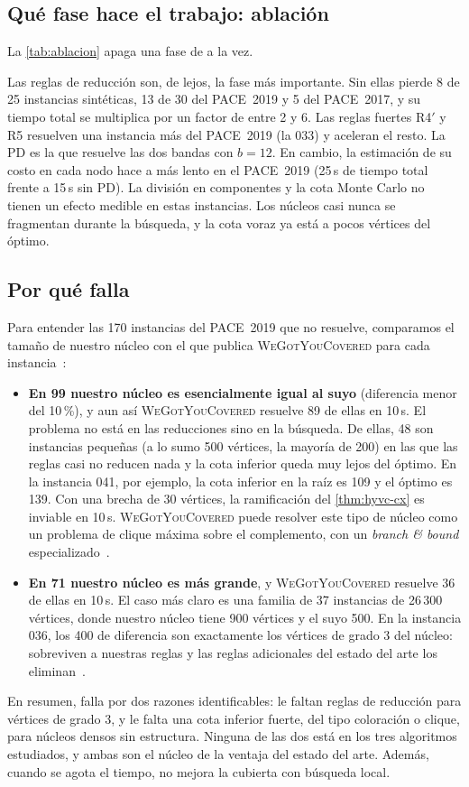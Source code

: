 \subsection{Qué fase hace el trabajo: ablación}
La \cref{tab:ablacion} apaga una fase de \hyvc{} a la vez.



Las reglas de reducción son, de lejos, la fase más importante. Sin ellas \hyvc{} pierde 8 de 25 instancias sintéticas, 13 de 30 del PACE~2019 y 5 del PACE~2017, y su tiempo total se multiplica por un factor de entre 2 y 6. Las reglas fuertes R4$'$ y R5 resuelven una instancia más del PACE~2019 (la 033) y aceleran el resto. La PD es la que resuelve las dos bandas con $b=12$. En cambio, la estimación de su costo en cada nodo hace a \hyvc{} más lento en el PACE~2019 (25\,s de tiempo total frente a 15\,s sin PD). La división en componentes y la cota Monte Carlo no tienen un efecto medible en estas instancias. Los núcleos casi nunca se fragmentan durante la búsqueda, y la cota voraz ya está a pocos vértices del óptimo.

\subsection{Por qué falla \hyvc}\label{sec:fallos}
Para entender las 170 instancias del PACE~2019 que \hyvc{} no resuelve, comparamos el tamaño de nuestro núcleo con el que publica \textsc{WeGotYouCovered} para cada instancia~\citep{hespe2020}:
\begin{itemize}
  \item \textbf{En 99 nuestro núcleo es esencialmente igual al suyo} (diferencia menor del 10\,\%), y aun así \textsc{WeGotYouCovered} resuelve 89 de ellas en 10\,s. El problema no está en las reducciones sino en la búsqueda. De ellas, 48 son instancias pequeñas (a lo sumo 500 vértices, la mayoría de 200) en las que las reglas casi no reducen nada y la cota inferior queda muy lejos del óptimo. En la instancia 041, por ejemplo, la cota inferior en la raíz es 109 y el óptimo es 139. Con una brecha de 30 vértices, la ramificación del \cref{thm:hyvc-cx} es inviable en 10\,s. \textsc{WeGotYouCovered} puede resolver este tipo de núcleo como un problema de clique máxima sobre el complemento, con un \emph{branch \& bound} especializado~\citep{hespe2020}.
  \item \textbf{En 71 nuestro núcleo es más grande}, y \textsc{WeGotYouCovered} resuelve 36 de ellas en 10\,s. El caso más claro es una familia de 37 instancias de 26\,300 vértices, donde nuestro núcleo tiene 900 vértices y el suyo 500. En la instancia 036, los 400 de diferencia son exactamente los vértices de grado 3 del núcleo: sobreviven a nuestras reglas y las reglas adicionales del estado del arte los eliminan~\citep{akiba2016}.
\end{itemize}
En resumen, \hyvc{} falla por dos razones identificables: le faltan reglas de reducción para vértices de grado 3, y le falta una cota inferior fuerte, del tipo coloración o clique, para núcleos densos sin estructura. Ninguna de las dos está en los tres algoritmos estudiados, y ambas son el núcleo de la ventaja del estado del arte. Además, cuando se agota el tiempo, \hyvc{} no mejora la cubierta con búsqueda local.


